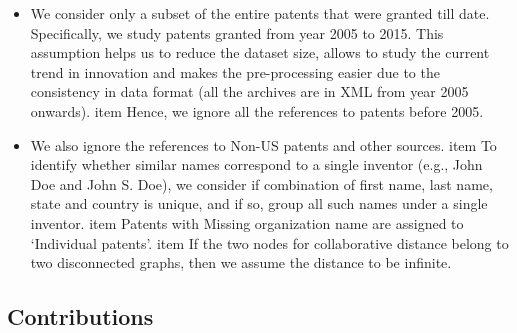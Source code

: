 	\begin{itemize}
		\item We consider only a subset of the entire patents that were granted till
		date. Specifically, we study patents granted from year 2005 to 2015. This
		assumption helps us to reduce the dataset size, allows to study the current
		trend in innovation and makes the pre-processing easier due to the
		consistency in data format (all the archives are in XML from year 2005
		onwards). item Hence, we ignore all the references to patents before 2005.

		\item We also ignore the references to Non-US patents and other sources. item
		To identify whether similar names correspond to a single inventor (e.g., John
		Doe and John S. Doe), we consider if combination of first name, last name,
		state and country is unique, and if so, group all such names under a single
		inventor.  item Patents with Missing organization name  are assigned to
		`Individual patents'. item If the two nodes for collaborative distance belong
		to two disconnected graphs, then we assume the distance to be infinite.
	\end{itemize}


\subsection{Contributions}
